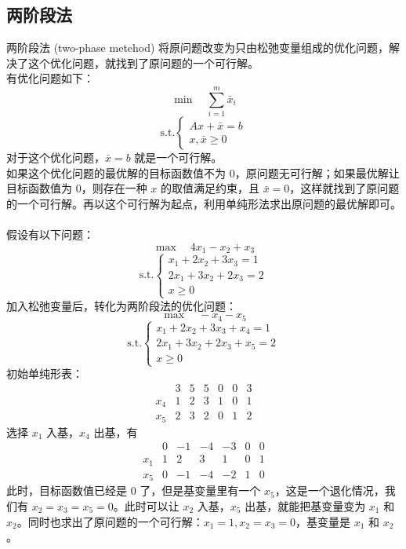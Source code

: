 \subsection{两阶段法}
两阶段法 (two-phase metehod) 将原问题改变为只由松弛变量组成的优化问题，解决了这个优化问题，就找到了原问题的一个可行解。 \\
有优化问题如下：
$$
\min \quad \sum_{i = 1}^{m} \bar{x}_i
$$
$$
\text{s.t.} 
\begin{cases}
    Ax + \bar{x} = b \\
    x, \bar{x} \ge 0
\end{cases}
$$
对于这个优化问题，$\bar{x} = b$ 就是一个可行解。 \\
如果这个优化问题的最优解的目标函数值不为 $0$，原问题无可行解；如果最优解让目标函数值为 $0$，则存在一种 $x$ 的取值满足约束，且 $\bar{x} = 0$，这样就找到了原问题的一个可行解。再以这个可行解为起点，利用单纯形法求出原问题的最优解即可。 \\~\\
假设有以下问题：
$$
\max \quad 4x_1 - x_2 + x_3
$$
$$
\text{s.t.} 
\begin{cases}
    x_1 + 2x_2 + 3x_3 = 1 \\
    2x_1 + 3x_2 + 2x_3 = 2 \\
    x \ge 0
\end{cases}
$$
加入松弛变量后，转化为两阶段法的优化问题：
$$
\max \quad -x_4 - x_5
$$
$$
\text{s.t.} 
\begin{cases}
    x_1 + 2x_2 + 3x_3 + x_4 = 1 \\
    2x_1 + 3x_2 + 2x_3 + x_5 = 2 \\
    x \ge 0
\end{cases}
$$
初始单纯形表：
$$
\begin{array}{c|ccccc|c} & 3 & 5 & 5 & 0 & 0 & 3 \\ \hline x_4 & 1 & 2 & 3 & 1 & 0 & 1 \\ x_5 & 2 & 3 & 2 & 0 & 1 & 2\end{array}
$$
选择 $x_1$ 入基，$x_4$ 出基，有
$$
\begin{array}{c|ccccc|c} & 0 & -1 & -4 & -3 & 0 & 0 \\ \hline x_1 & 1 & 2 & 3 & 1 & 0 & 1 \\ x_5 & 0 & -1 & -4 & -2 & 1 & 0 \end{array}
$$
此时，目标函数值已经是 $0$ 了，但是基变量里有一个 $x_5$，这是一个退化情况，我们有 $x_2 = x_3 = x_5 = 0$。此时可以让 $x_2$ 入基，$x_5$ 出基，就能把基变量变为 $x_1$ 和 $x_2$。同时也求出了原问题的一个可行解：$x_1 = 1, x_2 = x_3 = 0$，基变量是 $x_1$ 和 $x_2$。 \\
